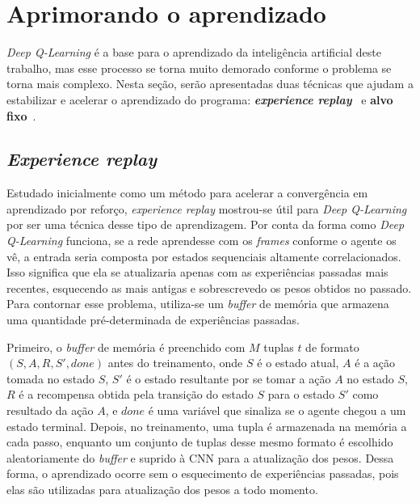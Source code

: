 
\section{Aprimorando o aprendizado}
\label{sec:enhance}

\textit{Deep Q-Learning} é a base para o aprendizado da inteligência artificial deste trabalho, mas esse processo se torna muito demorado conforme o problema se torna mais complexo.
Nesta seção, serão apresentadas duas técnicas que ajudam a estabilizar e acelerar o aprendizado do programa:
\textit{\textbf{experience replay}}~\cite{Lin1992} e \textbf{alvo fixo}~\cite{humanLevelControlDRL}.


\subsection{\textit{Experience replay}}
\label{sec:er}

Estudado inicialmente como um método para acelerar a convergência em aprendizado por reforço, \textit{experience replay} mostrou-se útil para \textit{Deep Q-Learning} por ser uma técnica desse tipo de aprendizagem.
Por conta da forma como \textit{Deep Q-Learning} funciona, se a rede aprendesse com os \textit{frames} conforme o agente os vê, a entrada seria composta por estados sequenciais altamente correlacionados.
Isso significa que ela se atualizaria apenas com as experiências passadas mais recentes, esquecendo as mais antigas e sobrescrevedo os pesos obtidos no passado.
Para contornar esse problema, utiliza-se um \textit{buffer} de memória que armazena uma quantidade pré-determinada de experiências passadas.

Primeiro, o \textit{buffer} de memória é preenchido com $M$ tuplas $t$ de formato $(S, A, R, S', done)$ antes do treinamento, onde $S$ é o estado atual, $A$ é a ação tomada no estado $S$, $S'$ é o estado resultante por se tomar a ação $A$ no estado $S$, $R$ é a recompensa obtida pela transição do estado $S$ para o estado $S'$ como resultado da ação $A$, e $done$ é uma variável que sinaliza se o agente chegou a um estado terminal.
Depois, no treinamento, uma tupla é armazenada na memória a cada passo, enquanto um conjunto de tuplas desse mesmo formato é escolhido aleatoriamente do \textit{buffer} e suprido à CNN para a atualização dos pesos.
Dessa forma, o aprendizado ocorre sem o esquecimento de experiências passadas, pois elas são utilizadas para atualização dos pesos a todo momento.

